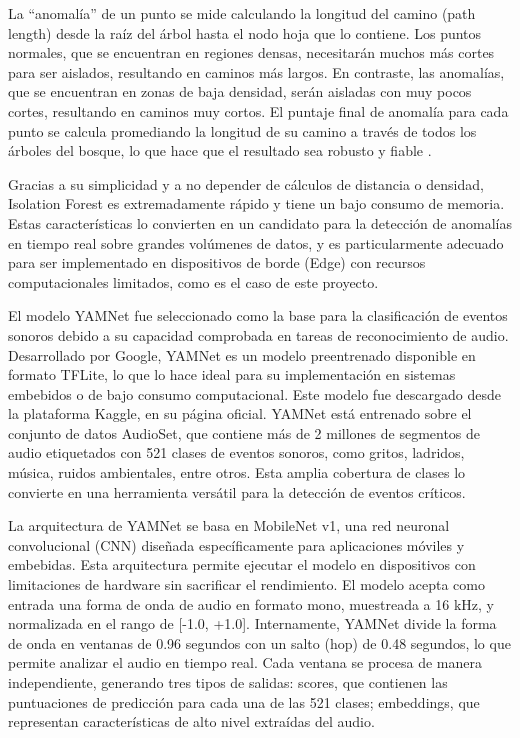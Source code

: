 La ``anomalía'' de un punto se mide calculando la longitud del camino (path length) desde la raíz del árbol hasta el nodo hoja que lo contiene. Los puntos normales, que se encuentran en regiones densas, necesitarán muchos más cortes para ser aislados, resultando en caminos más largos. En contraste, las anomalías, que se encuentran en zonas de baja densidad, serán aisladas con muy pocos cortes, resultando en caminos muy cortos. El puntaje final de anomalía para cada punto se calcula promediando la longitud de su camino a través de todos los árboles del bosque, lo que hace que el resultado sea robusto y fiable \cite{liu2012isolation}.

Gracias a su simplicidad y a no depender de cálculos de distancia o densidad, Isolation Forest es extremadamente rápido y tiene un bajo consumo de memoria. Estas características lo convierten en un candidato para la detección de anomalías en tiempo real sobre grandes volúmenes de datos, y es particularmente adecuado para ser implementado en dispositivos de borde (Edge) con recursos computacionales limitados, como es el caso de este proyecto.


El modelo YAMNet fue seleccionado como la base para la clasificación de eventos sonoros debido a su capacidad comprobada en tareas de reconocimiento de audio. Desarrollado por Google, YAMNet es un modelo preentrenado disponible en formato TFLite, lo que lo hace ideal para su implementación en sistemas embebidos o de bajo consumo computacional. Este modelo fue descargado desde la plataforma Kaggle, en su página oficial. YAMNet está entrenado sobre el conjunto de datos AudioSet, que contiene más de 2 millones de segmentos de audio etiquetados con 521 clases de eventos sonoros, como gritos, ladridos, música, ruidos ambientales, entre otros. Esta amplia cobertura de clases lo convierte en una herramienta versátil para la detección de eventos críticos.

La arquitectura de YAMNet se basa en MobileNet v1, una red neuronal convolucional (CNN) diseñada específicamente para aplicaciones móviles y embebidas. Esta arquitectura permite ejecutar el modelo en dispositivos con limitaciones de hardware sin sacrificar el rendimiento. El modelo acepta como entrada una forma de onda de audio en formato mono, muestreada a 16 kHz, y normalizada en el rango de [-1.0, +1.0]. Internamente, YAMNet divide la forma de onda en ventanas de 0.96 segundos con un salto (hop) de 0.48 segundos, lo que permite analizar el audio en tiempo real. Cada ventana se procesa de manera independiente, generando tres tipos de salidas: scores, que contienen las puntuaciones de predicción para cada una de las 521 clases; embeddings, que representan características de alto nivel extraídas del audio.

